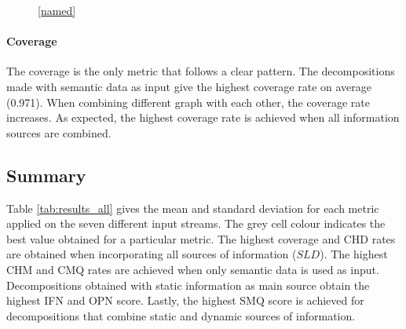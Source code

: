 \begin{figure}[h]
    \caption[The change in SMQ and CMQ when varying the weight of the input sources.]{The change in SMQ and CMQ when gradually increasing the weight of the static (for first four plots) or dynamic (for the last two plots) information sources. In the middle of the plot, both information sources are used equally. }\label{tab:project_results}
    \begin{subfigure}{.5\textwidth}
        \centering
        
    \end{subfigure}
    \hfill
    \begin{subfigure}{.5\textwidth}
        \centering
        
    \end{subfigure}
    \hfill
    \begin{subfigure}{.5\textwidth}
        \centering
        
    \end{subfigure}
    \hfill
    \begin{subfigure}{.5\textwidth}
        \centering
        
    \end{subfigure}
    \hfill
    \begin{subfigure}{.5\textwidth}
        \centering
        
    \end{subfigure}
    \hfill
    \begin{subfigure}{.5\textwidth}
        \centering
        
    \end{subfigure}
    \ref{named}
\end{figure}

\paragraph{Coverage}
The coverage is the only metric that follows a clear pattern. The decompositions made with semantic data as input give the highest coverage rate on average (0.971). When combining different graph with each other, the coverage rate increases. As expected, the highest coverage rate is achieved when all information sources are combined. 



\subsection{Summary}
Table \ref{tab:results_all} gives the mean and standard deviation for each metric applied on the seven different input streams. The grey cell colour indicates the best value obtained for a particular metric. The highest coverage and CHD rates are obtained when incorporating all sources of information ($SLD$). The highest CHM and CMQ rates are achieved when only semantic data is used as input. Decompositions obtained with static information as main source obtain the highest IFN and OPN score. Lastly, the highest SMQ score is achieved for decompositions that combine static and dynamic sources of information.


